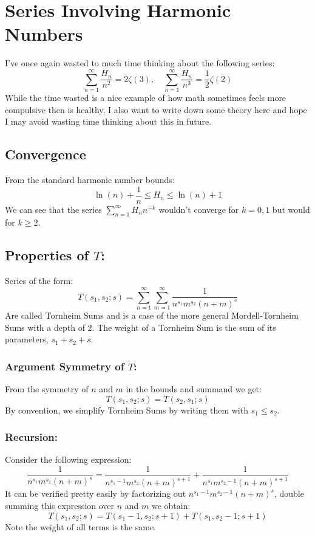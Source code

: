 
\section{Series Involving Harmonic Numbers}
I've once again wasted to much time thinking about the following series:
\[\sum_{n=1}^\infty\frac{H_n}{n^2}=2\zeta(3),\quad \sum_{n=1}^\infty\frac{H_n}{n^3}=\frac{1}{2}\zeta(2)\]
While the time wasted is a nice example of how math sometimes feels more compulsive then is healthy,
I also want to write down some theory here and hope I may avoid wasting time thinking about this in future.

\subsection{Convergence}
From the standard harmonic number bounds:
\[\ln(n)+\frac{1}{n} \leq H_n \leq \ln(n)+1\]
We can see that the series $\sum_{n=1}^\infty H_nn^{-k}$ wouldn't converge for $k=0,1$ but would for $k\geq 2$.

\subsection{Properties of $T$:}
Series of the form:
\[T(s_1,s_2;s) = \sum_{n=1}^{\infty}\sum_{m=1}^{\infty}\frac{1}{n^{s_1}m^{s_2}(n+m)^s}\]
Are called Tornheim Sums and is a case of the more general Mordell-Tornheim Sums with a depth of $2$.
The weight of a Tornheim Sum is the sum of its parameters, $s_1+s_2+s$.

\subsubsection{Argument Symmetry of $T$:}
From the symmetry of $n$ and $m$ in the bounds and summand we get:
\[T(s_1,s_2;s) = T(s_2,s_1;s)\]
By convention, we simplify Tornheim Sums by writing them with $s_1\leq s_2$.

\subsubsection{Recursion:}
Consider the following expression:
\[\frac{1}{n^{s_1}m^{s_2}(n+m)^s} = \frac{1}{n^{s_1-1}m^{s_2}(n+m)^{s+1}}+\frac{1}{n^{s_1}m^{s_2-1}(n+m)^{s+1}}\]
It can be verified pretty easily by factorizing out $n^{s_1-1}m^{s_2-1}(n+m)^s$,
double summing this expression over $n$ and $m$ we obtain:
\[T(s_1,s_2;s) = T(s_1-1,s_2;s+1)+T(s_1,s_2-1;s+1)\]
Note the weight of all terms is the same.


